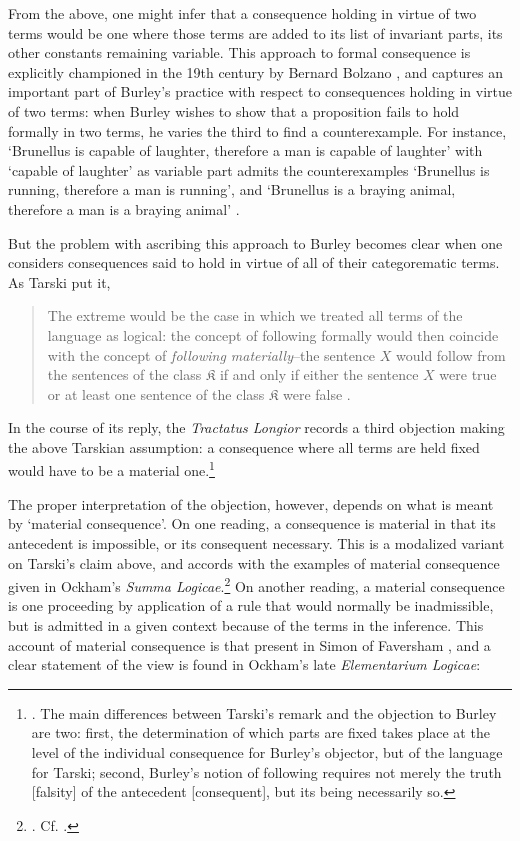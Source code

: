 \documentclass[]{birkjour}
\begin{document}
From the above, one might infer that a consequence holding in virtue of two terms would be one where those terms are added to its list of invariant parts, its other constants remaining variable. This approach to formal consequence is explicitly championed in the 19th century by Bernard Bolzano \autocite{George1986}, and captures an important part of Burley's practice with respect to consequences holding in virtue of two terms: when Burley wishes to show that a proposition fails to hold formally in two terms, he varies the third to find a counterexample. For instance, `Brunellus is capable of laughter, therefore a man is capable of laughter' with `capable of laughter' as variable part admits the counterexamples `Brunellus is running, therefore a man is running', and `Brunellus is a braying animal, therefore a man is a braying animal' \autocite[84.13-15]{BurleyDPAL}. 

But the problem with ascribing this approach to Burley becomes clear when one considers consequences said to hold in virtue of all of their categorematic terms. As Tarski put it, 
\begin{quote}
	The extreme would be the case in which we treated all terms of the language as logical: the concept of following formally would then coincide with the concept of \textit{following materially}--the sentence $X$ would follow from the sentences of the class $\mathfrak{K}$ if and only if either the sentence $X$ were true or at least one sentence of the class $\mathfrak{K}$ were false \autocite[pp. 188-189]{Tarski2002}.
\end{quote}

In the course of its reply, the \textit{Tractatus Longior} records a third objection making the above Tarskian assumption: a consequence where all terms are held fixed would have to be a material one.\footnote{\autocite[p. 86.4-9]{BurleyDPAL}. The main differences between Tarski's remark and the objection to Burley are two: first, the determination of which parts are fixed takes place at the level of the individual consequence for Burley's objector, but of the language for Tarski; second, Burley's notion of following requires not merely the truth [falsity] of the antecedent [consequent], but its being necessarily so.} 

The proper interpretation of the objection, however, depends on what is meant by `material consequence'. On one reading, a consequence is material in that its antecedent is impossible, or its consequent necessary. This is a modalized variant on Tarski's claim above, and accords with the examples of material consequence given in Ockham's \textit{Summa Logicae}.\footnote{\autocite[III-3. 1, p. 589]{OckhamSL}. Cf. \autocite[p. 7, par. 18]{Green-Pedersen1980a}.} On another reading, a material consequence is one proceeding by application of a rule that would normally be inadmissible, but is admitted in a given context because of the terms in the inference. This account of material consequence is that present in Simon of Faversham \autocite[q. 36]{FavershamQE}, and a clear statement of the view is found in Ockham's late \textit{Elementarium Logicae}:
\end{document}
